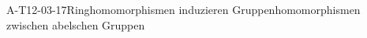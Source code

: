 
\begin{REM}{A-T12-03-17}{Ringhomomorphismen induzieren Gruppenhomomorphismen zwischen abelschen Gruppen}
\end{REM}
